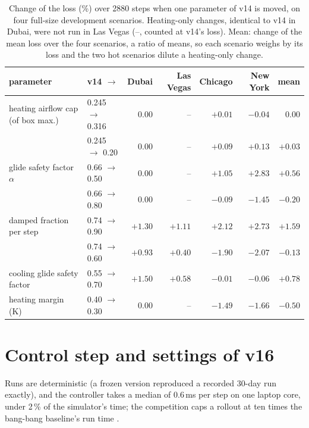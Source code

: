 \documentclass{article}
\begin{document}
\begin{table}[h]\centering
\caption{Change of the loss (\%) over 2880 steps when one parameter of v14 is moved, on four full-size development
scenarios. Heating-only changes, identical to v14 in Dubai, were not run in Las Vegas (--, counted at v14's loss). Mean: change of the mean loss over the four scenarios, a ratio of means, so each scenario weighs by its loss and the two hot scenarios dilute a heating-only change.}
\label{tab:sens}
\small
\setlength{\tabcolsep}{4pt}
\begin{tabular}{llrrrrr}
\toprule
parameter & v14 $\to$ & Dubai & Las Vegas & Chicago & New York & mean \\
\midrule
heating airflow cap (of box max.) & 0.245 $\to$ 0.316 & 0.00 & -- & $+0.01$ & $-0.04$ & 0.00 \\
 & 0.245 $\to$ 0.20 & 0.00 & -- & $+0.09$ & $+0.13$ & $+0.03$ \\
glide safety factor $\alpha$ & 0.66 $\to$ 0.50 & 0.00 & -- & $+1.05$ & $+2.83$ & $+0.56$ \\
 & 0.66 $\to$ 0.80 & 0.00 & -- & $-0.09$ & $-1.45$ & $-0.20$ \\
damped fraction per step & 0.74 $\to$ 0.90 & $+1.30$ & $+1.11$ & $+2.12$ & $+2.73$ & $+1.59$ \\
 & 0.74 $\to$ 0.60 & $+0.93$ & $+0.40$ & $-1.90$ & $-2.07$ & $-0.13$ \\
cooling glide safety factor & 0.55 $\to$ 0.70 & $+1.50$ & $+0.58$ & $-0.01$ & $-0.06$ & $+0.78$ \\
heating margin (K) & 0.40 $\to$ 0.30 & 0.00 & -- & $-1.49$ & $-1.66$ & $-0.50$ \\
\bottomrule
\end{tabular}
\end{table}

\section{Control step and settings of v16}\label{app:settings}
Runs are deterministic (a frozen version reproduced a recorded 30-day run exactly), and the controller takes a median
of 0.6\,ms per step on one laptop core, under 2\,\% of the simulator's time; the competition caps a rollout at ten times
the bang-bang baseline's run time \cite{goldfeder2026smart}.
\end{document}
